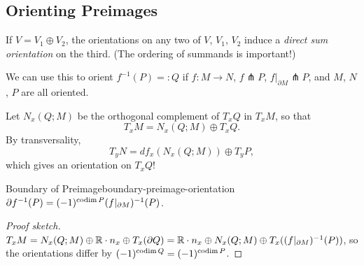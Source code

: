 \subsection{Orienting Preimages}

If $V = V_1 \oplus V_2$, the orientations on any two of $V$, $V_1$, $V_2$ induce a \emph{direct sum orientation} on the third. (The ordering of summands is important!)

We can use this to orient $f^{-1}(P) =: Q$ if $f \colon M \to N$, $f \pitchfork P$, $f|_{\partial M} \pitchfork P$, and $M$, $N$, $P$ are all oriented.

Let $N_x(Q; M)$ be the orthogonal complement of $T_x Q$ in $T_x M$, so that
\[
    T_x M = N_x(Q; M) \oplus T_x Q.
\]
By transversality,
\[
    T_y N = df_x(N_x(Q; M)) \oplus T_y P,
\]
which gives an orientation on $T_x Q$!

\begin{proposition}{Boundary of Preimage}{boundary-preimage-orientation}
    $\partial f^{-1}(P) = (-1)^{\operatorname{codim} P} (f|_{\partial M})^{-1}(P)$.
\end{proposition}

\begin{proof}[Proof sketch]
    $T_x M = N_x(Q; M) \oplus \mathbb{R} \cdot n_x \oplus T_x(\partial Q) = \mathbb{R} \cdot n_x \oplus N_x(Q; M) \oplus T_x((f|_{\partial M})^{-1}(P))$, so the orientations differ by $(-1)^{\operatorname{codim} Q} = (-1)^{\operatorname{codim} P}$.
\end{proof}
